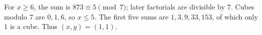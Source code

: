 For $x\ge6$, the sum is $873\equiv5\pmod7$; later factorials are divisible by $7$. Cubes modulo $7$ are $0,1,6$, so $x\le5$. The first five sums are $1,3,9,33,153$, of which only $1$ is a cube. Thus $\boxed{(x,y)=(1,1)}$.
